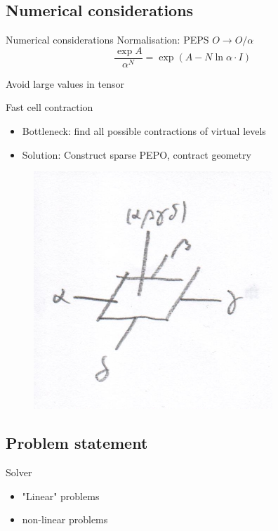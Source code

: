 \documentclass[aspectratio=169]{beamer}
\begin{document}
\subsection{Numerical considerations}
\begin{frame}{Numerical considerations}
    Normalisation: PEPS $O \rightarrow O/ \alpha$
    \begin{equation}
        \frac{ \exp A } { \alpha^N }  =  \exp \left(   A- N \ln{\alpha} \cdot I \right)
    \end{equation}

    Avoid large values in tensor
\end{frame}

\begin{frame}{Fast cell contraction}
    \begin{itemize}
        \item Bottleneck: find all possible contractions of virtual levels
        \item Solution: Construct sparse PEPO, contract geometry
    \end{itemize}

    \begin{figure}
        \includegraphics[scale=0.8]{Figures/pepo_contraction.pdf}
    \end{figure}
\end{frame}

\subsection{Problem statement}
\begin{frame}{Solver}
    \begin{itemize}
        \item "Linear" problems
        \item non-linear problems
    \end{itemize}
\end{frame}
\end{document}
